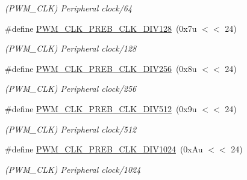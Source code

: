 \begin{DoxyCompactItemize}
\begin{DoxyCompactList}\small\item\em (P\+W\+M\+\_\+\+C\+LK) Peripheral clock/64 \end{DoxyCompactList}\item 
\mbox{\label{group__SAME70__PWM_gae47109fac5979f7f7f1db16ae132e46c}} 
\#define \mbox{\hyperlink{group__SAME70__PWM_gae47109fac5979f7f7f1db16ae132e46c}{P\+W\+M\+\_\+\+C\+L\+K\+\_\+\+P\+R\+E\+B\+\_\+\+C\+L\+K\+\_\+\+D\+I\+V128}}~(0x7u $<$$<$ 24)
\begin{DoxyCompactList}\small\item\em (P\+W\+M\+\_\+\+C\+LK) Peripheral clock/128 \end{DoxyCompactList}\item 
\mbox{\label{group__SAME70__PWM_gaaf3614b1a76b5b63428c8231cc383504}} 
\#define \mbox{\hyperlink{group__SAME70__PWM_gaaf3614b1a76b5b63428c8231cc383504}{P\+W\+M\+\_\+\+C\+L\+K\+\_\+\+P\+R\+E\+B\+\_\+\+C\+L\+K\+\_\+\+D\+I\+V256}}~(0x8u $<$$<$ 24)
\begin{DoxyCompactList}\small\item\em (P\+W\+M\+\_\+\+C\+LK) Peripheral clock/256 \end{DoxyCompactList}\item 
\mbox{\label{group__SAME70__PWM_gaa53b1dd4e614b72e3637aa44763d1620}} 
\#define \mbox{\hyperlink{group__SAME70__PWM_gaa53b1dd4e614b72e3637aa44763d1620}{P\+W\+M\+\_\+\+C\+L\+K\+\_\+\+P\+R\+E\+B\+\_\+\+C\+L\+K\+\_\+\+D\+I\+V512}}~(0x9u $<$$<$ 24)
\begin{DoxyCompactList}\small\item\em (P\+W\+M\+\_\+\+C\+LK) Peripheral clock/512 \end{DoxyCompactList}\item 
\mbox{\label{group__SAME70__PWM_gae9f6d0e24b13520c2a68e86b083210e2}} 
\#define \mbox{\hyperlink{group__SAME70__PWM_gae9f6d0e24b13520c2a68e86b083210e2}{P\+W\+M\+\_\+\+C\+L\+K\+\_\+\+P\+R\+E\+B\+\_\+\+C\+L\+K\+\_\+\+D\+I\+V1024}}~(0x\+Au $<$$<$ 24)
\begin{DoxyCompactList}\small\item\em (P\+W\+M\+\_\+\+C\+LK) Peripheral clock/1024 \end{DoxyCompactList}\item 
\mbox{\label{group__SAME70__PWM_ga77c0afa3572c801d2b6cd0290b28aa4b}} 

\end{DoxyCompactItemize}
